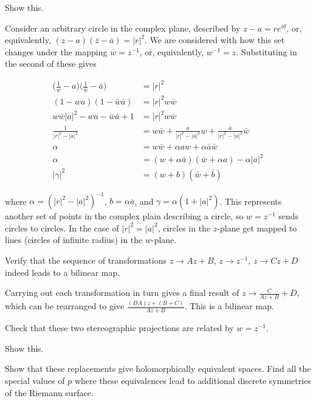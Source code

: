 \documentclass[../the-road-to-reality.tex]{subfiles}
\begin{document}
\begin{questions}
\question Show this.

\begin{solution}
	Consider an arbitrary circle in the complex plane, described by $z - a = re^{i\theta}$, or, equivalently, $(z - a)(\bar{z} - \bar{a}) = |r|^2$. We are considered with how this set changes under the mapping $w = z^{-1}$, or, equivalently, $w^{-1} = z$. Substituting in the second of these gives
	
	\begin{align*}
		\Big(\frac{1}{w} - a\Big)\Big(\frac{1}{\bar{w}} - \bar{a}\Big) &= |r|^2 \\
		(1 - wa)(1 - \bar{w}\bar{a}) &= |r|^2w\bar{w} \\
		w\bar{w}|a|^2 - wa - \bar{w}\bar{a} + 1 &= |r|^2w\bar{w} \\
		\frac{1}{|r|^2 - |a|^2} &= w\bar{w} + \frac{a}{|r|^2 - |a|^2}w + \frac{\bar{a}}{|r|^2 - |a|^2}\bar{w} \\
		\alpha &= w\bar{w} + \alpha{a}w + \alpha\bar{a}\bar{w} \\
		\alpha &= (w + \alpha\bar{a})(\bar{w} + \alpha{a}) - \alpha|a|^2 \\
		|\gamma|^2 &= (w + b)(\bar{w} + \bar{b})
	\end{align*}
	
	where $\alpha = (|r|^2 - |a|^2)^{-1}$, $b = \alpha\bar{a}$, and $\gamma = \alpha(1 + |a|^2)$. This represents another set of points in the complex plain describing a circle, so $w = z^{-1}$ sends circles to circles. In the case of $|r|^2 = |a|^2$, circles in the $z$-plane get mapped to lines (circles of infinite radius) in the $w$-plane.
\end{solution}

\question Verify that the sequence of transformations $z \to Az + B$, $z \to z^{-1}$, $z \to Cz + D$ indeed leads to a bilinear map.

\begin{solution}
	Carrying out each transformation in turn gives a final result of $z \to \frac{C}{Az + B} + D$, which can be rearranged to give $\frac{(DA)z + (B + C)}{Az + B}$. This is a bilinear map.
\end{solution}

\question Check that these two stereographic projections are related by $w = z^{-1}$.

\question Show this.

\question Show that these replacements give holomorphically equivalent spaces. Find all the special values of $p$ where these equivalences lead to additional discrete symmetries of the Riemann surface.

\end{questions}
	
\end{document}
